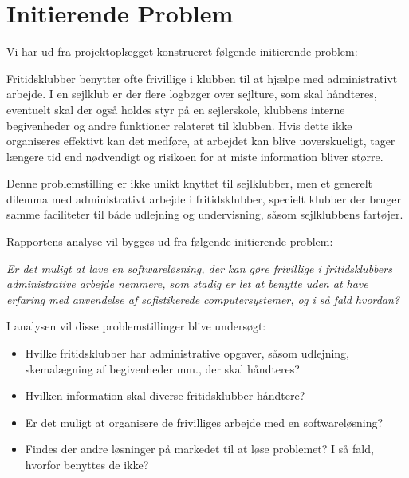 \section{Initierende Problem}
Vi har ud fra projektoplægget konstrueret følgende initierende problem:

Fritidsklubber benytter ofte frivillige i klubben til at hjælpe med administrativt arbejde.  I en sejlklub er der flere
logbøger over sejlture, som skal håndteres, eventuelt skal der også holdes styr på en sejlerskole, klubbens interne
begivenheder og andre funktioner relateret til klubben. Hvis dette ikke organiseres effektivt kan det medføre, at
arbejdet kan blive uoverskueligt, tager længere tid end nødvendigt og risikoen for at miste information bliver større.

Denne problemstilling er ikke unikt knyttet til sejlklubber, men et generelt dilemma med administrativt
arbejde i fritidsklubber, specielt klubber der bruger samme faciliteter til både udlejning og undervisning, såsom sejlklubbens fartøjer.

Rapportens analyse vil bygges ud fra følgende initierende problem:

\textit{Er det muligt at lave en softwareløsning, der kan gøre frivillige i fritidsklubbers administrative
arbejde nemmere, som stadig er let at benytte uden at have  erfaring med anvendelse af sofistikerede computersystemer, og i så fald hvordan?}

I analysen vil disse problemstillinger blive undersøgt:

\begin{itemize}
  \item Hvilke fritidsklubber har administrative opgaver, såsom udlejning, skemalægning af begivenheder mm., der
        skal håndteres?
  \item Hvilken information skal diverse fritidsklubber håndtere?
  \item Er det muligt at organisere de frivilliges arbejde med en softwareløsning?
  \item Findes der andre løsninger på markedet til at løse problemet? I så fald, hvorfor benyttes de ikke?
\end{itemize}